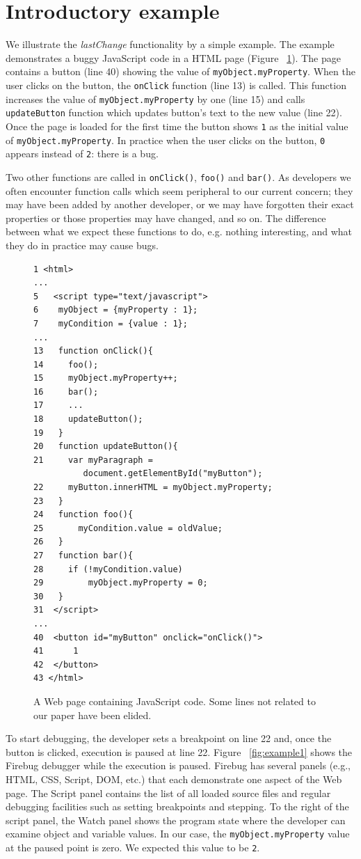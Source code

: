 \documentclass[preprint]{sigplanconf}
\begin{document}
\section{Introductory example}

We illustrate the \textit{lastChange} functionality by a simple
example. The example demonstrates a buggy JavaScript code in a HTML
page (Figure ~\ref{fig:js-code}). The page contains a button (line 40)
showing the value of \texttt{myObject.myProperty}.  When the user
clicks on the button, the \texttt{onClick} function (line 13) is
called. This function increases the value of
\texttt{myObject.myProperty} by one (line 15) and calls
\texttt{updateButton} function which updates button's text to the new
value (line 22).  Once the page is loaded for the first time the
button shows \texttt{1} as the initial value of
\texttt{myObject.myProperty}.  In practice when the user clicks on the
button, \texttt{0} appears instead of \texttt{2}: there is a bug.

Two other functions are called in \texttt{onClick()}, \texttt{foo()}
and \texttt{bar()}. As developers we often encounter function calls
which seem peripheral to our current concern; they may have been added
by another developer, or we may have forgotten their exact properties
or those properties may have changed, and so on. The difference
between what we expect these functions to do, e.g. nothing
interesting, and what they do in practice may cause bugs.


\begin{figure}[htp]
\begin{verbatim}
1 <html>
...
5   <script type="text/javascript">
6    myObject = {myProperty : 1};
7    myCondition = {value : 1};
...
13   function onClick(){
14     foo();
15     myObject.myProperty++;
16     bar();
17     ...
18     updateButton();
19   }
20   function updateButton(){
21     var myParagraph =
          document.getElementById("myButton");
22     myButton.innerHTML = myObject.myProperty;
23   }   
24   function foo(){
25  	 myCondition.value = oldValue;
26   }  
27   function bar(){ 
28     if (!myCondition.value)
29         myObject.myProperty = 0;
30   }
31  </script> 
...
40  <button id="myButton" onclick="onClick()">
41  	1 
42  </button>
43 </html>
\end{verbatim}
\caption{A Web page containing JavaScript code. Some lines not related to our paper have been elided.}
\label{fig:js-code}
\end{figure}

To start debugging, the developer sets a breakpoint
on line 22 and, once the button is clicked, execution is paused at line
22. Figure ~\ref{fig:example1} shows the Firebug debugger while the
execution is paused. Firebug has several panels (e.g., HTML, CSS,
Script, DOM, etc.) that each demonstrate one aspect of the Web page.
The Script panel contains the list of all loaded source
files and regular debugging facilities such as setting breakpoints and
stepping. To the right of the script panel, the Watch panel shows the program state
where the developer can examine object and variable values. In our case, the
\texttt{myObject.myProperty} value at the paused point is zero. We expected this value to be \texttt{2}.
\end{document}
